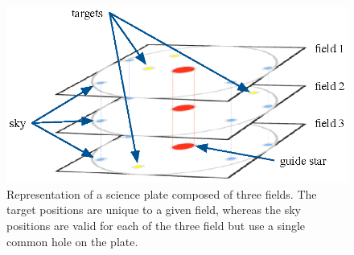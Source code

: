 \begin{figure}[!t]
\centering
\includegraphics[width=0.7\linewidth]{part10/Lorente_P048/stackedFullPlate3dWithLabels.eps}
\caption {Representation of a science plate composed of three fields. The target positions are unique to a given field, whereas the sky positions are valid for each of the three field but use a single common hole on the plate.}
\label {p048_FigStackedFields}
\end{figure}

